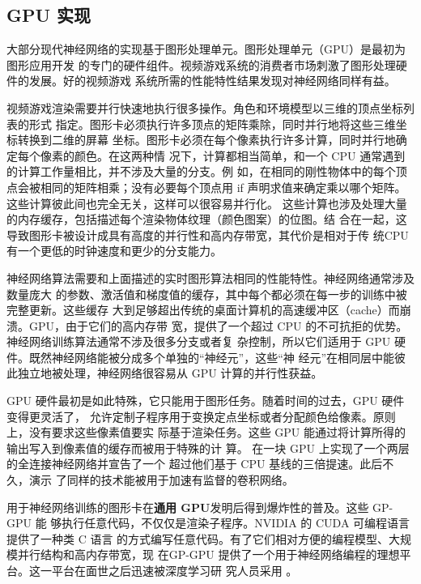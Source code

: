 \subsection{GPU 实现}
\label{subsec:gpu_implementations}

大部分现代神经网络的实现基于图形处理单元。图形处理单元（GPU）是最初为图形应用开发
的专门的硬件组件。视频游戏系统的消费者市场刺激了图形处理硬件的发展。好的视频游戏
系统所需的性能特性结果发现对神经网络同样有益。

视频游戏渲染需要并行快速地执行很多操作。角色和环境模型以三维的顶点坐标列表的形式
指定。图形卡必须执行许多顶点的矩阵乘除，同时并行地将这些三维坐标转换到二维的屏幕
坐标。图形卡必须在每个像素执行许多计算，同时并行地确定每个像素的颜色。在这两种情
况下，计算都相当简单，和一个 CPU 通常遇到的计算工作量相比，并不涉及大量的分支。例
如，在相同的刚性物体中的每个顶点会被相同的矩阵相乘；没有必要每个顶点用 {\serif
  if} 声明求值来确定乘以哪个矩阵。这些计算彼此间也完全无关，这样可以很容易并行化。
这些计算也涉及处理大量的内存缓存，包括描述每个渲染物体纹理（颜色图案）的位图。结
合在一起，这导致图形卡被设计成具有高度的并行性和高内存带宽，其代价是相对于传
统CPU 有一个更低的时钟速度和更少的分支能力。

神经网络算法需要和上面描述的实时图形算法相同的性能特性。神经网络通常涉及数量庞大
的参数、激活值和梯度值的缓存，其中每个都必须在每一步的训练中被完整更新。这些缓存
大到足够超出传统的桌面计算机的高速缓冲区（cache）而崩溃。GPU，由于它们的高内存带
宽，提供了一个超过 CPU 的不可抗拒的优势。神经网络训练算法通常不涉及很多分支或者复
杂控制，所以它们适用于 GPU 硬件。既然神经网络能被分成多个单独的“神经元”，这些“神
经元”在相同层中能彼此独立地被处理，神经网络很容易从 GPU 计算的并行性获益。

GPU 硬件最初是如此特殊，它只能用于图形任务。随着时间的过去，GPU 硬件变得更灵活了，
允许定制子程序用于变换定点坐标或者分配颜色给像素。原则上，没有要求这些像素值要实
际基于渲染任务。这些 GPU 能通过将计算所得的输出写入到像素值的缓存而被用于特殊的计
算。\citet{Steinkrau2005} 在一块 GPU 上实现了一个两层的全连接神经网络并宣告了一个
超过他们基于 CPU 基线的三倍提速。此后不久，\citet{chellapilla:inria-00112631}演示
了同样的技术能被用于加速有监督的卷积网络。

用于神经网络训练的图形卡在\textbf{通用 GPU}发明后得到爆炸性的普及。这些 GP-GPU 能
够执行任意代码，不仅仅是渲染子程序。NVIDIA 的 CUDA 可编程语言提供了一种类 C 语言
的方式编写任意代码。有了它们相对方便的编程模型、大规模并行结构和高内存带宽，现
在GP-GPU 提供了一个用于神经网络编程的理想平台。这一平台在面世之后迅速被深度学习研
究人员采用 \citep{RainaICML09,Ciresan-2010}。

